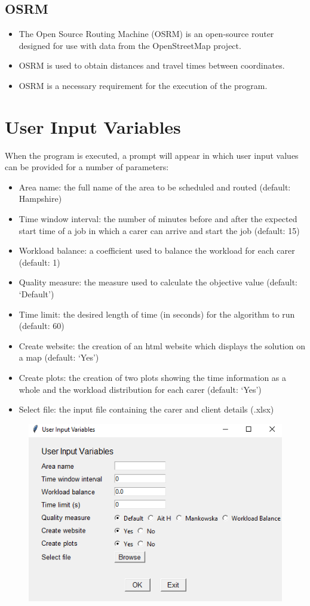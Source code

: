 \documentclass[a4paper]{article}
\begin{document}
\subsection{OSRM}
\begin{itemize}[leftmargin=*]
	\item The Open Source Routing Machine (OSRM) is an open-source router designed for use with data from the OpenStreetMap project.
	\item OSRM is used to obtain distances and travel times between coordinates.
	\item OSRM is a necessary requirement for the execution of the program.
\end{itemize}

\section{User Input Variables}
When the program is executed, a prompt will appear in which user input values can be provided for a number of parameters:
\begin{itemize}[leftmargin=*]
	\item Area name: the full name of the area to be scheduled and routed (default: Hampshire)
	\item Time window interval: the number of minutes before and after the expected start time of a job in which a carer can arrive and start the job (default: 15)
	\item Workload balance: a coefficient used to balance the workload for each carer (default: 1)
	\item Quality measure: the measure used to calculate the objective value (default: `Default')
	\item Time limit: the desired length of time (in seconds) for the algorithm to run (default: 60)
	\item Create website: the creation of an html website which displays the solution on a map (default: `Yes')
	\item Create plots: the creation of two plots showing the time information as a whole and the workload distribution for each carer (default: `Yes')
	\item Select file: the input file containing the carer and client details (.xlsx)
\end{itemize}

\begin{figure}[H]
	\centering
	\includegraphics[width=0.6\linewidth]{figures/userinputscreenshot}%
\end{figure}
\end{document}
